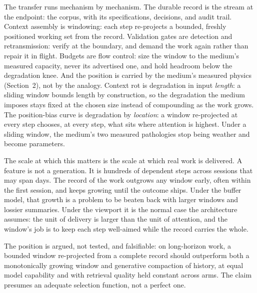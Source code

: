 \documentclass[11pt, a4paper]{article}
\begin{document}
The transfer runs mechanism by mechanism. The durable record is the stream at the
endpoint: the corpus,
with its specifications, decisions, and audit trail. Context assembly is
windowing: each step re-projects a bounded, freshly positioned working set from the
record. Validation gates are detection and retransmission: verify at the boundary, and
demand the work again rather than repair it in flight. Budgets are flow control: size
the window to the medium's measured capacity, never its advertised one, and hold
headroom below the degradation knee. And the position is carried by the medium's
measured physics (Section~2), not by the analogy. Context rot is degradation in input
\emph{length}: a sliding window bounds length by construction, so the degradation the
medium imposes stays fixed at the chosen size instead of compounding as the work grows.
The position-bias curve is degradation by \emph{location}: a window re-projected at every
step chooses, at every step, what sits where attention is highest. Under a sliding
window, the medium's two measured pathologies stop being weather and become parameters.

The scale at which this matters is the scale at which real work is delivered. A feature
is not a generation. It is hundreds of dependent steps across sessions that may span
days. The record of the work outgrows any window early, often within the first
session, and keeps growing until the outcome ships. Under the buffer model, that
growth is a problem to be beaten back with larger windows and lossier summaries. Under
the viewport it is the normal case the architecture assumes: the unit of delivery is
larger than the unit of attention, and the window's job is to keep each step well-aimed
while the record carries the whole.

The position is argued, not tested, and falsifiable: on long-horizon work, a
bounded window re-projected from a complete record should outperform both a
monotonically growing window and generative compaction of history, at equal model
capability and with retrieval quality held constant across arms. The claim presumes an
adequate selection function, not a perfect one.
\end{document}
